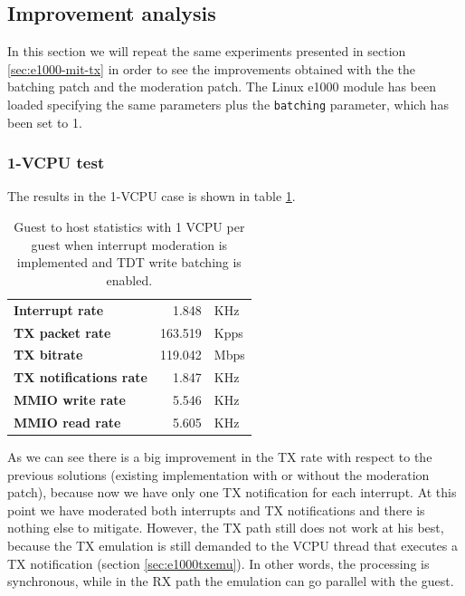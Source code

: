 \subsection{Improvement analysis}
\label{sec:e1000-mit-bat-tx}
In this section we will repeat the same experiments presented in section \ref{sec:e1000-mit-tx} in order to see the improvements
obtained with the the batching patch and the moderation patch. The Linux e1000 module has been loaded specifying the same parameters 
plus the \texttt{batching} parameter, which has been set to 1.

\subsubsection{1-VCPU test}
The results in the 1-VCPU case is shown in table \ref{tab:e1000-mit-bat-tx-g2h1vcpu}.

\begin{table}
\begin{center}
\begin{tabular}{lrl}
\toprule
\textbf{Interrupt rate} & 1.848 & KHz\\
\textbf{TX packet rate} & 163.519 & Kpps\\
\textbf{TX bitrate} & 119.042 & Mbps\\
\textbf{TX notifications rate} & 1.847 & KHz\\
\textbf{MMIO write rate} & 5.546 & KHz\\
\textbf{MMIO read rate} & 5.605 & KHz\\
\bottomrule
\end{tabular}
\end{center}
\caption{Guest to host statistics with 1 VCPU per guest when interrupt moderation is implemented and TDT write batching is enabled.}
\label{tab:e1000-mit-bat-tx-g2h1vcpu}
\end{table}

As we can see there is a big improvement in the TX rate with respect to the previous solutions (existing implementation with or without
the moderation patch), because now we have only one TX notification for each interrupt. At this point we have moderated
both interrupts and TX notifications and there is nothing else to mitigate.
However, the TX path still does not work at his best, because the TX emulation is still demanded to the VCPU thread that executes a
TX notification (section \ref{sec:e1000txemu}). In other words, the processing is synchronous, while in the RX path the emulation can 
go parallel with the guest.

